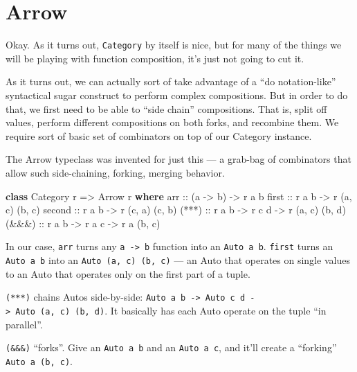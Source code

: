 \documentclass[]{article}
\newenvironment{Shaded}{}{}
\newcommand{\DataTypeTok}[1]{\textcolor[rgb]{0.56,0.13,0.00}{#1}}
\newcommand{\KeywordTok}[1]{\textcolor[rgb]{0.00,0.44,0.13}{\textbf{#1}}}
\newcommand{\NormalTok}[1]{#1}
\newcommand{\OtherTok}[1]{\textcolor[rgb]{0.00,0.44,0.13}{#1}}
\begin{document}
\hypertarget{arrow}{%
\section{Arrow}\label{arrow}}

Okay. As it turns out, \texttt{Category} by itself is nice, but for many of the
things we will be playing with function composition, it's just not going to cut
it.

As it turns out, we can actually sort of take advantage of a ``do
notation-like'' syntactical sugar construct to perform complex compositions. But
in order to do that, we first need to be able to ``side chain'' compositions.
That is, split off values, perform different compositions on both forks, and
recombine them. We require sort of basic set of combinators on top of our
Category instance.

The Arrow typeclass was invented for just this --- a grab-bag of combinators
that allow such side-chaining, forking, merging behavior.

\begin{Shaded}
\begin{Highlighting}[]
\KeywordTok{class} \DataTypeTok{Category}\NormalTok{ r }\OtherTok{=>} \DataTypeTok{Arrow}\NormalTok{ r }\KeywordTok{where}
\OtherTok{    arr    ::}\NormalTok{ (a }\OtherTok{->}\NormalTok{ b) }\OtherTok{->}\NormalTok{ r a b}
\OtherTok{    first  ::}\NormalTok{ r a b }\OtherTok{->}\NormalTok{ r (a, c) (b, c)}
\OtherTok{    second ::}\NormalTok{ r a b }\OtherTok{->}\NormalTok{ r (c, a) (c, b)}
\OtherTok{    (***)  ::}\NormalTok{ r a b }\OtherTok{->}\NormalTok{ r c d }\OtherTok{->}\NormalTok{ r (a, c) (b, d)}
\OtherTok{    (&&&)  ::}\NormalTok{ r a b }\OtherTok{->}\NormalTok{ r a c }\OtherTok{->}\NormalTok{ r a (b, c)}
\end{Highlighting}
\end{Shaded}

In our case, \texttt{arr} turns any \texttt{a\ -\textgreater{}\ b} function into
an \texttt{Auto\ a\ b}. \texttt{first} turns an \texttt{Auto\ a\ b} into an
\texttt{Auto\ (a,\ c)\ (b,\ c)} --- an Auto that operates on single values to an
Auto that operates only on the first part of a tuple.

\texttt{(***)} chains Autos side-by-side:
\texttt{Auto\ a\ b\ -\textgreater{}\ Auto\ c\ d\ -\textgreater{}\ Auto\ (a,\ c)\ (b,\ d)}.
It basically has each Auto operate on the tuple ``in parallel''.

\texttt{(\&\&\&)} ``forks''. Give an \texttt{Auto\ a\ b} and an
\texttt{Auto\ a\ c}, and it'll create a ``forking'' \texttt{Auto\ a\ (b,\ c)}.
\end{document}
